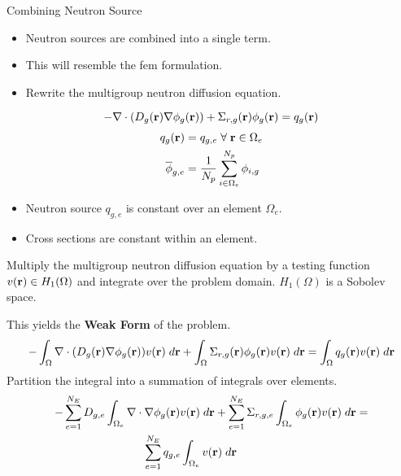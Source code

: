 \begin{frame}{Combining Neutron Source}
  \begin{itemize}
    \item Neutron sources are combined into a single term.
    \item This will resemble the \gls{fem} formulation.
    \item Rewrite the multigroup neutron diffusion equation.
  \end{itemize}
  \begin{equation}
    \label{eq:multigroup_source}
    - \mathbf{\nabla} \cdot( D_g(\mathbf{r}) \mathbf{\nabla} \phi_g(\mathbf{r})) + \Sigma_{r,g}(\mathbf{r}) \phi_g(\mathbf{r}) = 
      q_g(\mathbf{r})
  \end{equation}
  \begin{align}
    q_g(\mathbf{r}) &= q_{g,e} \; \forall \; \mathbf{r} \in \Omega_e \\
    \overline{\phi}_{g,e} &= \frac{1}{N_p} \sum_{i \in \Omega_e}^{N_p} \phi_{i,g}
  \end{align}

  \begin{itemize}
    \item Neutron source $q_{g,e}$ is constant over an element $\Omega_e$.
    \item Cross sections are constant within an element.
  \end{itemize}
\end{frame}

\begin{frame}{}
  Multiply the multigroup neutron diffusion equation by a testing function
  $v(\mathbf{r}) \in H_1(\Omega)$ and integrate over the problem domain. $H_1(\Omega)$
  is a Sobolev space.
  
  \vspace{0.25in}
  This yields the \textbf{Weak Form} of the problem.
  \begin{equation}
    \label{eq:fem_weak_form}
    - \int_{\Omega} \mathbf{\nabla} \cdot (D_g(\mathbf{r}) \mathbf{\nabla} \phi_g(\mathbf{r})) v(\mathbf{r}) \; d\mathbf{r}
      + \int_{\Omega} \Sigma_{r,g}(\mathbf{r}) \phi_g(\mathbf{r}) v(\mathbf{r}) \;d\mathbf{r} =
      \int_{\Omega} q_g(\mathbf{r}) v(\mathbf{r}) \;d\mathbf{r}
  \end{equation}
  Partition the integral into a summation of integrals over elements.
  \begin{multline}
    \label{eq:element_by_element}
    -\sum_{e=1}^{N_E} D_{g,e} 
      \int_{\Omega_e} \mathbf{\nabla} \cdot \mathbf{\nabla} \phi_g(\mathbf{r}) v(\mathbf{r}) \; d\mathbf{r} +
      \sum_{e=1}^{N_E} \Sigma_{r,g,e} \int_{\Omega_e} \phi_g(\mathbf{r}) v(\mathbf{r}) 
      \;d\mathbf{r} = 
    \\
      \sum_{e=1}^{N_E} q_{g,e} \int_{\Omega_e} v(\mathbf{r}) 
      \; d\mathbf{r} \hspace{0.5in}
  \end{multline}
\end{frame}

